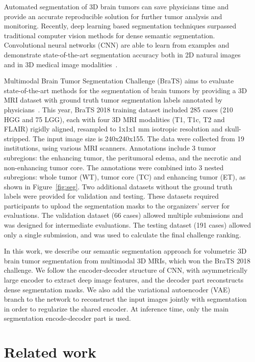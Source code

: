 \documentclass[runningheads]{llncs}
\newcommand{\0}{\ensuremath{\mathbf{0}}}
\newcommand{\1}{\ensuremath{\mathbf{1}}}
\begin{document}
Automated segmentation of 3D brain tumors can save physicians time and provide an accurate reproducible solution for further tumor analysis and monitoring. Recently, deep learning based segmentation techniques surpassed traditional computer vision methods for dense semantic segmentation. Convolutional neural networks (CNN)  are able to learn from examples and demonstrate state-of-the-art segmentation accuracy both in 2D natural images~\cite{deeplabv3plus2018} and in 3D medical image modalities~\cite{Milletari16}. 

Multimodal Brain Tumor Segmentation Challenge (BraTS) aims to evaluate state-of-the-art methods for the segmentation of brain tumors by providing a 3D MRI dataset with ground truth tumor segmentation labels annotated by physicians~\cite{BratsAll2018,brats1,brats2,brats3,brats4}. This year, BraTS 2018 training dataset included 285 cases (210 HGG and 75 LGG), each with four 3D MRI modalities (T1, T1c, T2 and FLAIR) rigidly aligned, resampled to 1x1x1 mm isotropic resolution and skull-stripped. The input image size is 240x240x155. The data were collected from 19 institutions, using various MRI scanners. Annotations include 3 tumor subregions: the enhancing tumor, the peritumoral edema, and the necrotic and non-enhancing tumor core.  The annotations were combined into 3 nested subregions: whole tumor (WT), tumor core (TC) and enhancing tumor (ET), as shown in Figure~\ref{fig:seg}. Two additional datasets without the ground truth labels were provided for validation and testing. These datasets required participants to upload the segmentation masks to the organizers' server for evaluations. The validation dataset (66 cases) allowed multiple submissions and was designed for intermediate evaluations. The testing dataset (191 cases) allowed only a single submission, and was used to calculate the final challenge ranking.  


In this work, we describe our semantic segmentation approach for volumetric 3D brain tumor segmentation from multimodal 3D MRIs, which won the BraTS 2018 challenge. We follow the encoder-decoder structure of CNN, with asymmetrically large encoder to extract deep image features, and the decoder part reconstructs dense segmentation masks. We also add the variational autoencoder (VAE) branch to the network to reconstruct the input images jointly with segmentation in order to regularize the shared encoder. At inference time, only the main segmentation encode-decoder part is used.  


\section{Related work}
\label{sec:relatedwork}
\end{document}

